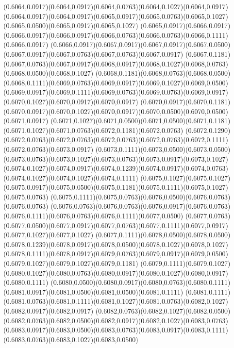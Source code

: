 (0.6064,0.0917)(0.6064,0.0917)(0.6064,0.0763)(0.6064,0.1027)(0.6064,0.0917)
\PST@Solid(0.6064,0.0917)(0.6064,0.0917)(0.6065,0.0917)(0.6065,0.0763)(0.6065,0.1027)(0.6065,0.0500)(0.6065,0.0917)(0.6065,0.1027)
(0.6065,0.0917)(0.6066,0.0917)(0.6066,0.0917)(0.6066,0.0917)(0.6066,0.0763)(0.6066,0.0763)(0.6066,0.1111)(0.6066,0.0917)
(0.6066,0.0917)(0.6067,0.0917)(0.6067,0.0917)(0.6067,0.0500)(0.6067,0.0917)(0.6067,0.0763)(0.6067,0.0763)(0.6067,0.0917)
(0.6067,0.1181)(0.6067,0.0763)(0.6067,0.0917)(0.6068,0.0917)(0.6068,0.1027)(0.6068,0.0763)(0.6068,0.0500)(0.6068,0.1027)
(0.6068,0.1181)(0.6068,0.0763)(0.6068,0.0500)(0.6068,0.1111)(0.6069,0.0763)(0.6069,0.0917)(0.6069,0.1027)(0.6069,0.0500)
(0.6069,0.0917)(0.6069,0.1111)(0.6069,0.0763)(0.6069,0.0763)(0.6069,0.0917)(0.6070,0.1027)(0.6070,0.0917)(0.6070,0.0917)
(0.6070,0.0917)(0.6070,0.1181)(0.6070,0.0917)(0.6070,0.1027)(0.6070,0.0917)(0.6070,0.0500)(0.6070,0.0500)(0.6071,0.0917)
(0.6071,0.1027)(0.6071,0.0500)(0.6071,0.0500)(0.6071,0.1181)(0.6071,0.1027)(0.6071,0.0763)(0.6072,0.1181)(0.6072,0.0763)
(0.6072,0.1290)(0.6072,0.0763)(0.6072,0.0763)(0.6072,0.0763)(0.6072,0.0763)(0.6072,0.1111)(0.6072,0.0763)(0.6073,0.0917)
(0.6073,0.1111)(0.6073,0.0500)(0.6073,0.0500)(0.6073,0.0763)(0.6073,0.1027)(0.6073,0.0763)(0.6073,0.0917)(0.6073,0.1027)
(0.6074,0.1027)(0.6074,0.0917)(0.6074,0.1239)(0.6074,0.0917)(0.6074,0.0763)(0.6074,0.1027)(0.6074,0.1027)(0.6074,0.1111)
(0.6075,0.1027)(0.6075,0.1027)(0.6075,0.0917)(0.6075,0.0500)(0.6075,0.1181)(0.6075,0.1111)(0.6075,0.1027)(0.6075,0.0763)
(0.6075,0.1111)(0.6075,0.0763)(0.6076,0.0500)(0.6076,0.0763)(0.6076,0.0763)
\PST@Solid(0.6076,0.0763)(0.6076,0.0763)(0.6076,0.0917)(0.6076,0.0763)(0.6076,0.1111)(0.6076,0.0763)(0.6076,0.1111)(0.6077,0.0500)
(0.6077,0.0763)(0.6077,0.0500)(0.6077,0.0917)(0.6077,0.0763)(0.6077,0.1111)(0.6077,0.0917)(0.6077,0.1027)(0.6077,0.1027)
(0.6077,0.1111)(0.6078,0.0500)(0.6078,0.0500)(0.6078,0.1239)(0.6078,0.0917)(0.6078,0.0500)(0.6078,0.1027)(0.6078,0.1027)
(0.6078,0.1111)(0.6078,0.0917)(0.6079,0.0763)(0.6079,0.0917)(0.6079,0.0500)(0.6079,0.1027)(0.6079,0.1027)(0.6079,0.1181)
(0.6079,0.1111)(0.6079,0.1027)(0.6080,0.1027)(0.6080,0.0763)(0.6080,0.0917)(0.6080,0.1027)(0.6080,0.0917)(0.6080,0.1111)
(0.6080,0.0500)(0.6080,0.0917)(0.6080,0.0763)(0.6080,0.1111)(0.6081,0.0917)(0.6081,0.0500)(0.6081,0.0500)(0.6081,0.1111)
(0.6081,0.1111)(0.6081,0.0763)(0.6081,0.1111)(0.6081,0.1027)(0.6081,0.0763)(0.6082,0.1027)(0.6082,0.0917)(0.6082,0.0917)
(0.6082,0.0763)(0.6082,0.1027)(0.6082,0.0500)(0.6082,0.0763)(0.6082,0.0500)(0.6082,0.0917)(0.6082,0.1027)(0.6083,0.0763)
(0.6083,0.0917)(0.6083,0.0500)(0.6083,0.0763)(0.6083,0.0917)(0.6083,0.1111)(0.6083,0.0763)(0.6083,0.1027)(0.6083,0.0500)
